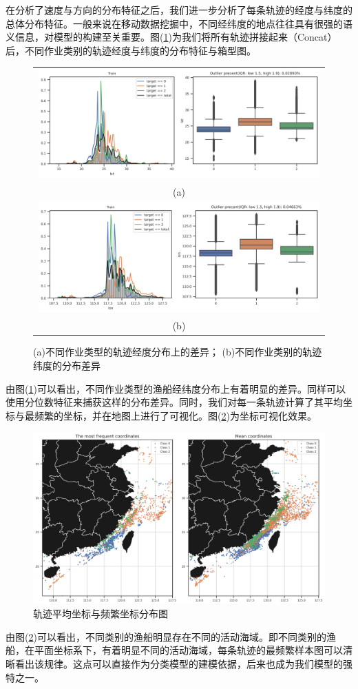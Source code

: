 \documentclass[UTF8, 12pt]{ctexart}
\begin{document}
	在分析了速度与方向的分布特征之后，我们进一步分析了每条轨迹的经度与纬度的总体分布特征。一般来说在移动数据挖掘中，不同经纬度的地点往往具有很强的语义信息，对模型的构建至关重要。图(\ref{sec_1_fig_6})为我们将所有轨迹拼接起来（Concat）后，不同作业类别的轨迹经度与纬度的分布特征与箱型图。
	\begin{figure}[H]
		\centering
		\begin{tabular}{c}
			\includegraphics[width=0.75\linewidth]{..//plots//feature_lat_distribution.png} \\
			(a) \\
			\includegraphics[width=0.75\linewidth]{..//plots//feature_lon_distribution.png} \\
			(b)
		\end{tabular}
		\caption{(a)不同作业类型的轨迹经度分布上的差异； (b)不同作业类别的轨迹纬度的分布差异}
		\label{sec_1_fig_6}
		\vspace{-0.2cm}
	\end{figure}
	由图(\ref{sec_1_fig_6})可以看出，不同作业类型的渔船经纬度分布上有着明显的差异。同样可以使用分位数特征来捕获这样的分布差异。同时，我们对每一条轨迹计算了其平均坐标与最频繁的坐标，并在地图上进行了可视化。图(\ref{sec_1_fig_7})为坐标可视化效果。
	\begin{figure}[H]
		\centering
		\includegraphics[width=0.75\linewidth]{..//plots//feature_mean_freq_coordinates.png}
		\caption{轨迹平均坐标与频繁坐标分布图}
		\label{sec_1_fig_7}
		\vspace{-0.2cm}
	\end{figure}
	由图(\ref{sec_1_fig_7})可以看出，不同类别的渔船明显存在不同的活动海域。即不同类别的渔船，在平面坐标系下，有着明显不同的活动海域，每条轨迹的最频繁样本图可以清晰看出该规律。这点可以直接作为分类模型的建模依据，后来也成为我们模型的强特之一。
\end{document}
